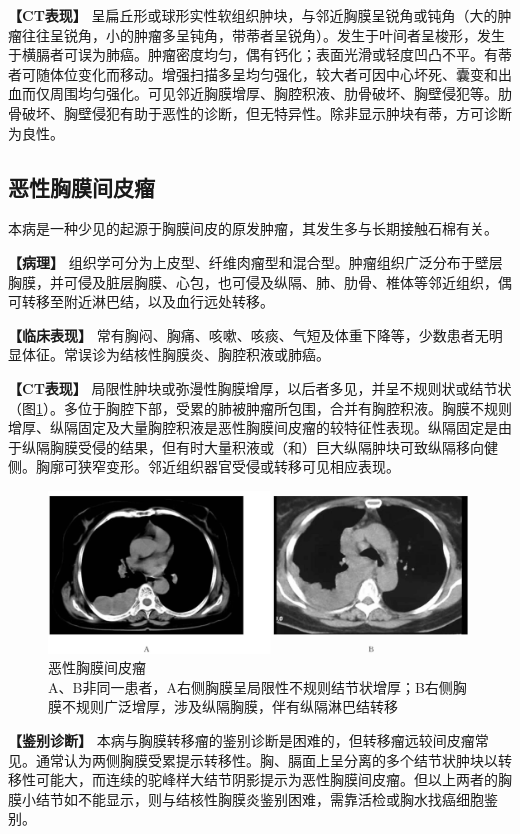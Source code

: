 \textbf{【CT表现】}
呈扁丘形或球形实性软组织肿块，与邻近胸膜呈锐角或钝角（大的肿瘤往往呈锐角，小的肿瘤多呈钝角，带蒂者呈锐角）。发生于叶间者呈梭形，发生于横膈者可误为肺癌。肿瘤密度均匀，偶有钙化；表面光滑或轻度凹凸不平。有蒂者可随体位变化而移动。增强扫描多呈均匀强化，较大者可因中心坏死、囊变和出血而仅周围均匀强化。可见邻近胸膜增厚、胸腔积液、肋骨破坏、胸壁侵犯等。肋骨破坏、胸壁侵犯有助于恶性的诊断，但无特异性。除非显示肿块有蒂，方可诊断为良性。

\subsection{恶性胸膜间皮瘤}

本病是一种少见的起源于胸膜间皮的原发肿瘤，其发生多与长期接触石棉有关。

\textbf{【病理】}
组织学可分为上皮型、纤维肉瘤型和混合型。肿瘤组织广泛分布于壁层胸膜，并可侵及脏层胸膜、心包，也可侵及纵隔、肺、肋骨、椎体等邻近组织，偶可转移至附近淋巴结，以及血行远处转移。

\textbf{【临床表现】}
常有胸闷、胸痛、咳嗽、咳痰、气短及体重下降等，少数患者无明显体征。常误诊为结核性胸膜炎、胸腔积液或肺癌。

\textbf{【CT表现】}
局限性肿块或弥漫性胸膜增厚，以后者多见，并呈不规则状或结节状（图\ref{fig9-46}）。多位于胸腔下部，受累的肺被肿瘤所包围，合并有胸腔积液。胸膜不规则增厚、纵隔固定及大量胸腔积液是恶性胸膜间皮瘤的较特征性表现。纵隔固定是由于纵隔胸膜受侵的结果，但有时大量积液或（和）巨大纵隔肿块可致纵隔移向健侧。胸廓可狭窄变形。邻近组织器官受侵或转移可见相应表现。

\begin{figure}[!htbp]
 \centering
 \includegraphics[width=.7\textwidth,height=\textheight,keepaspectratio]{./images/Image00244.jpg}
 \captionsetup{justification=centering}
 \caption{恶性胸膜间皮瘤\\{\small A、B非同一患者，A右侧胸膜呈局限性不规则结节状增厚；B右侧胸膜不规则广泛增厚，涉及纵隔胸膜，伴有纵隔淋巴结转移}}
 \label{fig9-46}
  \end{figure} 

\textbf{【鉴别诊断】}
本病与胸膜转移瘤的鉴别诊断是困难的，但转移瘤远较间皮瘤常见。通常认为两侧胸膜受累提示转移性。胸、膈面上呈分离的多个结节状肿块以转移性可能大，而连续的驼峰样大结节阴影提示为恶性胸膜间皮瘤。但以上两者的胸膜小结节如不能显示，则与结核性胸膜炎鉴别困难，需靠活检或胸水找癌细胞鉴别。

